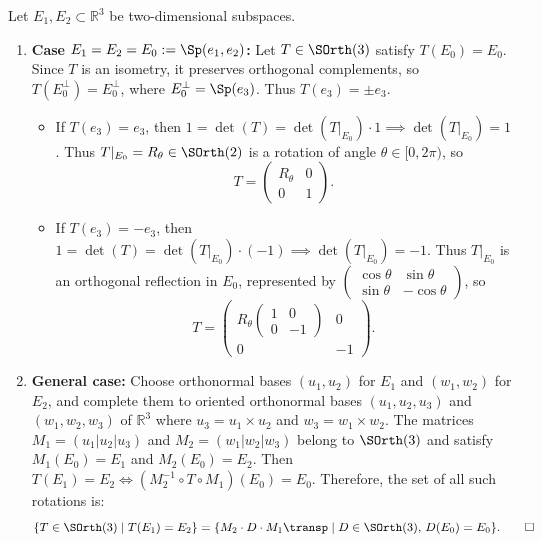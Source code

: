 \begin{exercisesolution*}
\label{sol:so3_rotations_subspaces}
Let $E_1, E_2 \subset \mathbb{R}^3$ be two-dimensional subspaces.
\begin{enumerate}[label=\textbf{(\alph*)}]
    \item \textbf{Case $E_1 = E_2 = E_0 := \Sp(e_1, e_2)$:}
    Let $T \in \SOrth(3)$ satisfy $T(E_0) = E_0$.
    Since $T$ is an isometry, it preserves orthogonal complements, so $T(E_0^\perp) = E_0^\perp$, where $E_0^\perp = \Sp(e_3)$.
    Thus $T(e_3) = \pm e_3$.
    \begin{itemize}
        \item If $T(e_3) = e_3$, then $1 = \det(T) = \det(T|_{E_0}) \cdot 1 \implies \det(T|_{E_0}) = 1$.
        Thus $T|_{E_0} = R_\theta \in \SOrth(2)$ is a rotation of angle $\theta \in [0, 2\pi)$, so
        \[
        T = \begin{pmatrix} R_\theta & 0 \\ 0 & 1 \end{pmatrix}.
        \]
        \item If $T(e_3) = -e_3$, then $1 = \det(T) = \det(T|_{E_0}) \cdot (-1) \implies \det(T|_{E_0}) = -1$.
        Thus $T|_{E_0}$ is an orthogonal reflection in $E_0$, represented by $\left(\begin{smallmatrix} \cos\theta & \sin\theta \\ \sin\theta & -\cos\theta \end{smallmatrix}\right)$, so
        \[
        T = \begin{pmatrix} R_\theta \begin{pmatrix} 1 & 0 \\ 0 & -1 \end{pmatrix} & 0 \\ 0 & -1 \end{pmatrix}.
        \]
    \end{itemize}

    \item \textbf{General case:}
    Choose orthonormal bases $(u_1, u_2)$ for $E_1$ and $(w_1, w_2)$ for $E_2$, and complete them to oriented orthonormal bases $(u_1, u_2, u_3)$ and $(w_1, w_2, w_3)$ of $\mathbb{R}^3$ where $u_3 = u_1 \times u_2$ and $w_3 = w_1 \times w_2$.
    The matrices $M_1 = (u_1 | u_2 | u_3)$ and $M_2 = (w_1 | w_2 | w_3)$ belong to $\SOrth(3)$ and satisfy $M_1(E_0) = E_1$ and $M_2(E_0) = E_2$.
    Then $T(E_1) = E_2 \iff (M_2^{-1} \circ T \circ M_1)(E_0) = E_0$.
    Therefore, the set of all such rotations is:
    \[
    \{ T \in \SOrth(3) \mid T(E_1) = E_2 \} = \{ M_2 \cdot D \cdot M_1\transp \mid D \in \SOrth(3), \, D(E_0) = E_0 \}. \qedhere
    \]
\end{enumerate}
\end{exercisesolution*}
